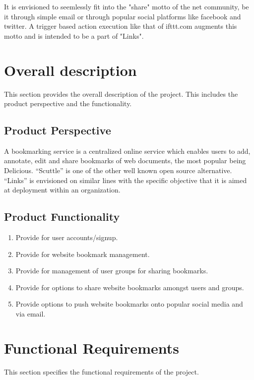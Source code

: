 \documentclass[11pt]{report} %
\begin{document}
It is envisioned to seemlessly fit into the "share" motto of the net community, be it through simple email or through popular social platforms like facebook and twitter. A trigger based action execution like that of ifttt.com augments this motto and is intended to be a part of "Links".

\maketitle
\chapter{Overall description}
This section provides the overall description of the project. This includes the product perspective and the functionality.
\section{Product Perspective}
A bookmarking service is a centralized online service which enables users to add, annotate, edit and share bookmarks of web documents, the most popular being Delicious. “Scuttle” is one of the other well known open source alternative. “Links” is envisioned on similar lines with the specific objective that it is aimed at deployment within an organization.
\section{Product Functionality}
\begin{enumerate}
\item
Provide for user accounts/signup.
\item
Provide for website bookmark management.
\item
Provide for management of user groups for sharing bookmarks.
\item
Provide for options to share website bookmarks amongst users and groups.
\item
Provide options to push website bookmarks onto popular social media and via email.
\end{enumerate}

\maketitle
\chapter{Functional Requirements}
This section specifies the functional requirements of the project.
\end{document}
